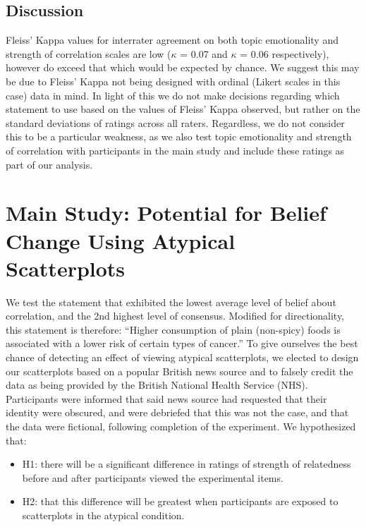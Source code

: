\documentclass[manuscript,screen,review,anonymous]{acmart}
\providecommand{\tightlist}{%
  \setlength{\itemsep}{0pt}\setlength{\parskip}{0pt}}\usepackage{longtable,booktabs,array}
\begin{document}
\subsection{Discussion}\label{sec-discussion-pre}

Fleiss' Kappa values for interrater agreement on both topic emotionality
and strength of correlation scales are low (\(\kappa\) = 0.07 and
\(\kappa\) = 0.06 respectively), however do exceed that which would be
expected by chance. We suggest this may be due to Fleiss' Kappa not
being designed with ordinal (Likert scales in this case) data in mind.
In light of this we do not make decisions regarding which statement to
use based on the values of Fleiss' Kappa observed, but rather on the
standard deviations of ratings across all raters. Regardless, we do not
consider this to be a particular weakness, as we also test topic
emotionality and strength of correlation with participants in the main
study and include these ratings as part of our analysis.

\section{Main Study: Potential for Belief Change Using Atypical
Scatterplots}\label{sec-main-study}

We test the statement that exhibited the lowest average level of belief
about correlation, and the 2nd highest level of consensus. Modified for
directionality, this statement is therefore: ``Higher consumption of
plain (non-spicy) foods is associated with a lower risk of certain types
of cancer.'' To give ourselves the best chance of detecting an effect of
viewing atypical scatterplots, we elected to design our scatterplots
based on a popular British news source and to falsely credit the data as
being provided by the British National Health Service (NHS).
Participants were informed that said news source had requested that
their identity were obscured, and were debriefed that this was not the
case, and that the data were fictional, following completion of the
experiment. We hypothesized that:

\begin{itemize}
\tightlist
\item
  H1: there will be a significant difference in ratings of strength of
  relatedness before and after participants viewed the experimental
  items.
\item
  H2: that this difference will be greatest when participants are
  exposed to scatterplots in the atypical condition.
\end{itemize}
\end{document}
